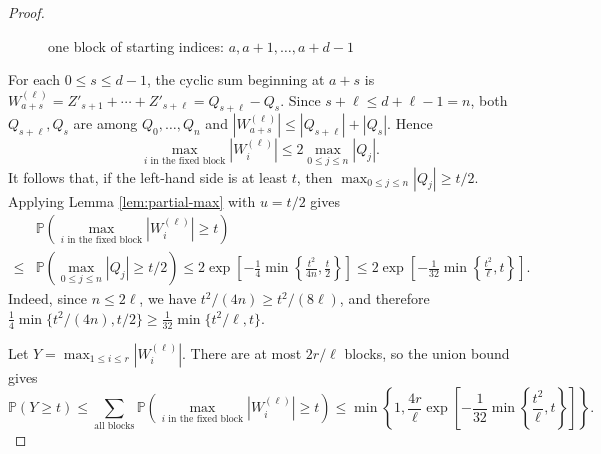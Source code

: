 \documentclass[12pt,a4paper]{article}
\numberwithin{equation}{section}
\theoremstyle{definition}
\theoremstyle{remark}
\begin{document}
\begin{proof}
\begin{figure}[htbp]
\caption{one block of starting indices: $a,a+1,\ldots,a+d-1$}
\label{fig:cyclic-block}
\end{figure}




For each $0\le s\le d-1$, the cyclic sum beginning at $a+s$ is
$W_{a+s}^{(\ell)}=Z'_{s+1}+\cdots+Z'_{s+\ell}=Q_{s+\ell}-Q_s$.
Since $s+\ell\le d+\ell-1=n$, both  $Q_{s+\ell}, Q_s$ are among
$Q_0,\ldots,Q_n$ and 
$|W_{a+s}^{(\ell)}|\le |Q_{s+\ell}|+|Q_s|$. Hence
$$ \max_{i\text{ in the fixed block}}|W_i^{(\ell)}|
 \le2\max_{0\le j\le n}|Q_j|.$$
It follows that, if the left-hand side is at least $t$, then
$\max_{0\le j\le n}|Q_j|\ge t/2$.  
Applying Lemma \ref{lem:partial-max} with $u=t/2$ gives
\begin{align*}
   &\mathbb{P}\left(\max_{i\text{ in the fixed block}}|W_i^{(\ell)}|\ge t\right)\\
   \le &\mathbb{P}\left(\max_{0\le j\le n}|Q_j|
   \ge t/2\right)
 \le2\exp\left[-\frac14\min\left\{\frac{t^2}{4n},\frac t2\right\}\right]
 \le2\exp\left[-\frac1{32}\min\left\{\frac{t^2}{\ell},t\right\}\right]. 
\end{align*}
Indeed, since $n\le2\ell$, we have $t^2/(4n)\ge t^2/(8\ell)$, and therefore
$\frac14\min\{t^2/(4n),t/2\}\ge\frac1{32}\min\{t^2/\ell,t\}$.

Let $Y=\max_{1\le i\le r}|W_i^{(\ell)}|$.  There are at most $2r/\ell$ blocks, so the union bound gives
\begin{equation}\label{eq:scan-tail}
 \mathbb{P}(Y\ge t)\le \sum_{\text{all blocks}}\mathbb{P}\left(\max_{i\text{ in the fixed block}}|W_i^{(\ell)}|\ge t\right)
 \le\min\left\{1,\frac{4r}{\ell}
 \exp\left[-\frac1{32}\min\left\{\frac{t^2}{\ell},t\right\}\right]\right\}.
\end{equation}


\end{proof}
\end{document}
